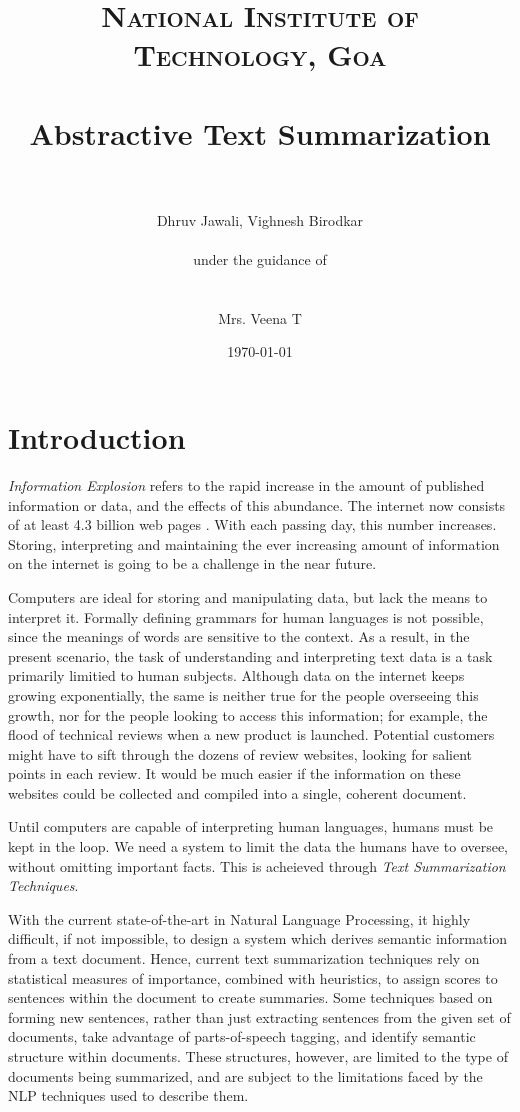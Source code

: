 \documentclass[paper=a4, fontsize=11pt]{scrartcl} %
\title{	
\normalfont \normalsize 
\textsc{National Institute of Technology, Goa} \\ [25pt] %
\horrule{0.5pt} \\[0.4cm] %
\huge Abstractive Text Summarization \\ %
\horrule{2pt} \\[0.5cm] %
}
\author{Dhruv Jawali, Vighnesh Birodkar \\
\\
\small{under the guidance of} \\
\\
\\
Mrs. Veena T
} %
\date{\normalsize\today} %
\numberwithin{equation}{section} %
\numberwithin{figure}{section} %
\numberwithin{table}{section} %
\begin{document}
\maketitle %
\pagebreak
\tableofcontents
\pagebreak
\listoffigures
\pagebreak




\section{Introduction}
\emph{Information Explosion} \cite{fshock} refers to the rapid increase in the amount of published information or data, and the effects of this abundance. The internet now consists of at least 4.3 billion web pages \cite{websize}. With each passing day, this number increases. Storing, interpreting and maintaining the ever increasing amount of information on the internet is going to be a challenge in the near future.\\
\par
Computers are ideal for storing and manipulating data, but lack the means to interpret it. Formally defining grammars for human languages is not possible, since the meanings of words are sensitive to the context. As a result, in the present scenario, the task of understanding and interpreting text data is a task primarily limitied to human subjects. Although data on the internet keeps growing exponentially, the same is neither true for the people overseeing this growth, nor for the people looking to access this information; for example, the flood of technical reviews when a new product is launched. Potential customers might have to sift through the dozens of review websites, looking for salient points in each review. It would be much easier if the information on these websites could be collected and compiled into a single, coherent document.\\
\par
Until computers are capable of interpreting human languages, humans must be kept in the loop. We need a system to limit the data the humans have to oversee, without omitting important facts. This is acheieved through \emph{Text Summarization Techniques}.\\
\par

With the current state-of-the-art in Natural Language Processing, it highly difficult, if not impossible, to design a system which derives semantic information from a text document. Hence, current text summarization techniques rely on statistical measures of importance, combined with heuristics, to assign scores to sentences within the document to create summaries. Some techniques based on forming new sentences, rather than just extracting sentences from the given set of documents, take advantage of parts-of-speech tagging, and identify semantic structure within documents. These structures, however, are limited to the type of documents being summarized, and are subject to the limitations faced by the NLP techniques used to describe them.\\
\par
\end{document}
